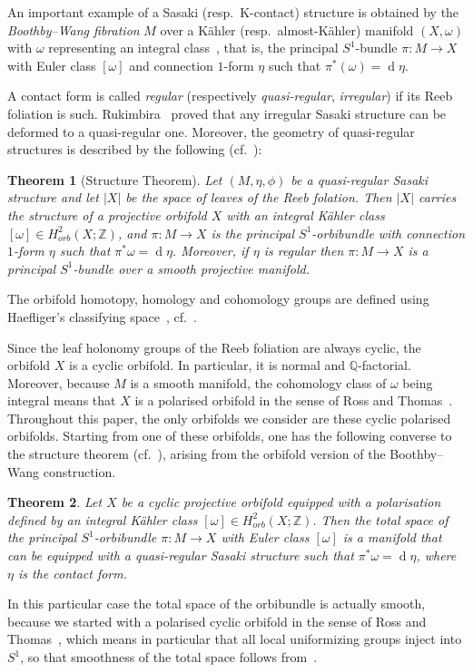 \documentclass[12pt,leqno]{amsart}
\newcommand{\Z}{\mathbb{Z}}
\newcommand{\q}{\mathbb{Q}}
\newcommand{\di}{{\operatorname{d}}}
\newtheorem{theor}{Theorem}
\begin{document}
An important example of a Sasaki (resp.~K-contact) structure is obtained by the \textit{Boothby--Wang fibration} 
$M$ over a K\"ahler (resp.~almost-K\"ahler) manifold $(X,\omega)$ with $\omega$ representing an integral class~\cite{BW}, 
that is, the principal $S^1$-bundle $\pi\colon M\longrightarrow X$ with Euler class $[\omega]$ and connection 
$1$-form $\eta$ such that $\pi^*(\omega)=\di\eta$.

A contact form is called \textit{regular} (respectively \textit{quasi-regular}, \textit{irregular}) 
if its Reeb foliation is such. 
Rukimbira~\cite{Ruk} proved that any irregular Sasaki structure can be deformed to a quasi-regular one. 
Moreover, the geometry of quasi-regular structures is described by the following 
(cf.~\cite[Theorem 7.5.1]{Boyer}):
\begin{theor}[Structure Theorem]\label{structure}
Let $(M,\eta,\phi)$ be a quasi-regular Sasaki structure and let $\vert X\vert$ be the space of leaves of the Reeb folation. 
Then $\vert X\vert$ carries the structure of a projective orbifold $X$ with an integral K\"ahler class 
$[\omega]\in H^2_{orb}(X;\Z)$, and $\pi\colon M\longrightarrow X$ is the principal $S^1$-orbibundle with 
connection $1$-form $\eta$ such that $\pi^*\omega=\di\eta$. 
Moreover, if $\eta$ is regular then $\pi\colon M\longrightarrow X$ is a principal 
$S^1$-bundle over a smooth projective manifold.
\end{theor}

The orbifold homotopy, homology and cohomology groups are defined using Haefliger's classifying 
space~\cite{Haefliger}, cf.~\cite[Section 4.3]{Boyer}.

Since the leaf holonomy groups of the Reeb foliation are always cyclic, the orbifold $X$ is a 
cyclic orbifold. In particular, it is normal and $\q$-factorial. Moreover, because $M$ is a 
smooth manifold, the cohomology class of $\omega$ being integral means that $X$ is a polarised orbifold 
 in the sense of Ross and Thomas~\cite[Definition~2.7]{RT}.
Throughout this paper, the only orbifolds we consider are these cyclic polarised orbifolds.
Starting from one of these orbifolds, one has the following converse to the structure theorem
(cf.~\cite[Theorem 7.5.2]{Boyer}), arising from the orbifold version of the Boothby--Wang 
construction.
\begin{theor}\label{conversestructure}
Let $X$ be a cyclic projective orbifold equipped with a polarisation defined by an integral K\"ahler class 
$[\omega]\in H^2_{orb}(X;\Z)$. Then the total space of the principal $S^1$-orbibundle 
$\pi\colon M\longrightarrow X$ with Euler class $[\omega]$
is a manifold that can be equipped with a quasi-regular Sasaki structure such that $\pi^*\omega=\di\eta$,
where $\eta$ is the contact form.
\end{theor}
In this particular case the total space of the orbibundle is actually smooth, because we started with a polarised cyclic 
orbifold in the sense of Ross and 
Thomas~\cite[Definition~2.7]{RT}, which means in particular that all local uniformizing groups inject into $S^1$,
so that smoothness of the total space follows from~\cite[Lemma~4.2.8]{Boyer}.
\end{document}
